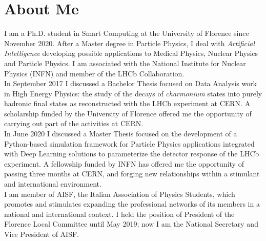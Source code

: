 \section*{About Me}
\begin{cvcontent}
I am a Ph.D. student in Smart Computing at the University of Florence since November 2020. After a Master degree in Particle Physics, I deal with \emph{Artificial Intelligence} developing possible applications to Medical Physics, Nuclear Physics and Particle Physics. I am associated with the National Institute for Nuclear Physics (INFN) and member of the LHCb Collaboration.
\\ [2mm]
In September 2017 I discussed a Bachelor Thesis focused on Data Analysis work in High Energy Physics: the study of the decays of \textit{charmonium} states into purely hadronic final states as reconstructed with the LHCb experiment at CERN. A scholarship funded by the University of Florence offered me the opportunity of carrying out part of the activities at CERN.
\\ [2mm]
In June 2020 I discussed a Master Thesis focused on the development of a Python-based simulation framework for Particle Physics applications integrated with Deep Learning solutions to parameterize the detector response of the LHCb experiment. A fellowship funded by INFN has offered me the opportunity of passing three months at CERN, and forging new relationships within a stimulant and international environment.
\\ [2mm]
I am member of AISF, the Italian Association of Physics Students, which promotes and stimulates expanding the professional networks of its members in a national and international context. I held the position of President of the Florence Local Committee until May 2019; now I am the National Secretary and Vice President of AISF.
\end{cvcontent}